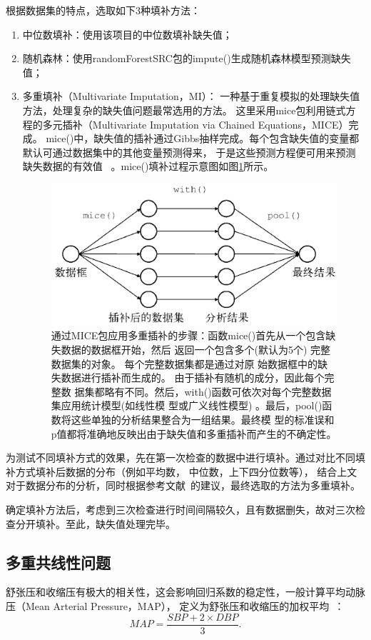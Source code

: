 \documentclass[lang=cn,11pt,a4paper,cite=super,AutoFakeBold]{elegantpaper}
\begin{document}
根据数据集的特点，选取如下3种填补方法：
\begin{enumerate}
   \item 中位数填补：使用该项目的中位数填补缺失值；
   \item 随机森林：使用randomForestSRC包的impute()生成随机森林模型预测缺失值；
   \item 多重填补（Multivariate Imputation，MI）：
   一种基于重复模拟的处理缺失值方法，处理复杂的缺失值问题最常选用的方法。
   这里采用mice包利用链式方程的多元插补（Multivariate Imputation via Chained Equations，MICE）完成。
   mice()中，缺失值的插补通过Gibbs抽样完成。每个包含缺失值的变量都默认可通过数据集中的其他变量预测得来， 
   于是这些预测方程便可用来预测缺失数据的有效值 ~\cite{ria}。mice()填补过程示意图如图\ref{fig:mice}所示。
   \begin{figure}[!htbp]
      \centering
      \includegraphics[width=0.7\linewidth]{img/mice.jpg}
      \caption{通过MICE包应用多重插补的步骤：函数mice()首先从一个包含缺失数据的数据框开始，然后
      返回一个包含多个(默认为5个) 完整数据集的对象。 每个完整数据集都是通过对原
      始数据框中的缺失数据进行插补而生成的。 由于插补有随机的成分，因此每个完整数
      据集都略有不同。然后，with()函数可依次对每个完整数据集应用统计模型(如线性模
      型或广义线性模型) 。最后，pool()函数将这些单独的分析结果整合为一组结果。最终模
      型的标准误和p值都将准确地反映出由于缺失值和多重插补而产生的不确定性。}
      \label{fig:mice}
   \end{figure}
\end{enumerate}

为测试不同填补方式的效果，先在第一次检查的数据中进行填补。通过对比不同填补方式填补后数据的分布（例如平均数，
中位数，上下四分位数等），
结合上文对于数据分布的分析，同时根据参考文献~\cite{mi}的建议，最终选取的方法为多重填补。

确定填补方法后，考虑到三次检查进行时间间隔较久，且有数据删失，故对三次检查分开填补。至此，缺失值处理完毕。

\subsection{多重共线性问题}
舒张压和收缩压有极大的相关性，这会影响回归系数的稳定性，一般计算平均动脉压（Mean Arterial Pressure，MAP），
定义为舒张压和收缩压的加权平均~\cite{helpstar}：
$$MAP=\frac{SBP + 2\times DBP}{3}.$$
\end{document}
